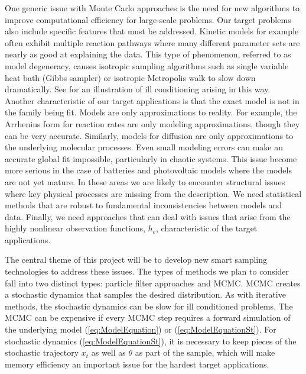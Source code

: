 \documentclass[11pt]{article}
\begin{document}
One generic issue with Monte Carlo approaches
is the need for new algorithms to improve computational efficiency for large-scale problems.
Our target problems also include specific features that must be addressed.
Kinetic models for example often exhibit multiple reaction pathways where
many different parameter sets are nearly as good at explaining the data.
This type of phenomenon, referred to as model degeneracy,
causes isotropic sampling algorithms such as single variable heat bath (Gibbs sampler) or isotropic
Metropolis walk to slow down dramatically.
See \cite{HouStretch} for an illustration of ill conditioning arising in this way.
Another characteristic of our target applications is that
the exact model is not in the family being fit.
Models are only approximations to reality.
For example, the Arrhenius form for reaction rates are only modeling approximations, though they can be very accurate.
Similarly, models for diffusion are only approximations to the underlying molecular processes.
Even small modeling errors can make an accurate global fit impossible, particularly in chaotic systems.
This issue become more serious in the case of batteries and photovoltaic models where the models
are not yet mature.  In these areas we are likely to encounter structural issues where key physical
processes are missing from the description.
We need statistical methods that are robust to fundamental inconsistencies between models and data.
Finally, we need approaches that can deal with issues that arise from the highly nonlinear observation
functions, $h_e$, characteristic of the target applications.

The central theme of this project will be to develop new smart sampling technologies 
to address these issues.
The types of methods we plan to consider fall into two distinct types:  particle filter approaches
and MCMC.
MCMC creates a stochastic dynamics that samples the desired distribution.
As with iterative methods, the stochastic dynamics can be slow for ill conditioned problems.
The MCMC can be expensive if every MCMC step requires a forward simulation of the underlying model
(\ref{eq:ModelEquation}) or (\ref{eq:ModelEquationSt}).
For stochastic dynamics (\ref{eq:ModelEquationSt}), it is necessary to keep pieces of the 
stochastic trajectory $x_t$ as well as $\theta$ as part of the sample, which will make
memory efficiency an important issue for the hardest target applications.
\end{document}
